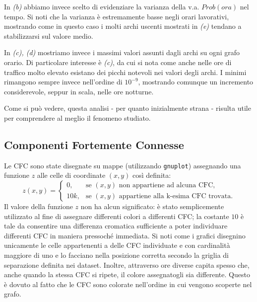 \documentclass[10pt,a4paper]{article}
\begin{document}
In \emph{(b)} abbiamo invece scelto di evidenziare la varianza della v.a. $Prob(ora)$ nel tempo. Si noti che la varianza è estremamente basse negli orari lavorativi, mostrando come in questo caso i molti archi uscenti mostrati in \emph{(e)} tendano a stabilizzarsi sul valore medio.

In \emph{(c), (d)} mostriamo invece i massimi valori assunti dagli archi su ogni grafo orario. Di particolare interesse è \emph{(c)}, da cui si nota come anche nelle ore di traffico molto elevato esistano dei picchi notevoli nei valori degli archi. I minimi rimangono sempre invece nell'ordine di $10^{-9}$, mostrando comunque un incremento considerevole, seppur in scala, nelle ore notturne.

Come si può vedere, questa analisi - per quanto inizialmente strana - risulta utile per comprendere al meglio il fenomeno studiato.
 
\subsection{Componenti Fortemente Connesse}

Le CFC sono state disegnate su mappe (utilizzando \verb!gnuplot!) assegnando una funzione $z$ alle celle di
coordinate $(x,y)$ così definita:
$$
z(x,y) =
\begin{cases}
0, & \text{se $(x,y)$ non appartiene ad alcuna CFC,} \\
10k, & \text{se $(x,y)$ appartiene alla k-esima CFC trovata.}
\end{cases}
$$
Il valore della funzione $z$ non ha alcun significato: è stato semplicemente utilizzato al fine di assegnare differenti colori a differenti CFC; la costante $10$ è tale da consentire una differenza cromatica sufficiente a poter individuare differenti CFC in maniera pressoché immediata. Si noti come i grafici disegnino unicamente le celle appartenenti a delle CFC individuate e con cardinalità maggiore di uno e lo facciano nella posizione corretta secondo la griglia di separazione definita nei dataset. Inoltre, attraverso ore diverse capita spesso che, anche quando la stessa CFC si ripete, il colore assegnatogli sia differente.
Questo è dovuto al fatto che le CFC sono colorate nell'ordine in cui vengono scoperte nel grafo.
\end{document}
